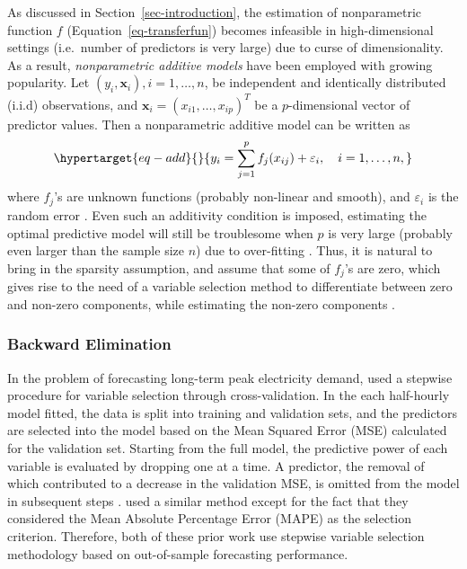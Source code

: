 \documentclass[11pt,a4paper,]{article}
\begin{document}
As discussed in Section~\ref{sec-introduction}, the estimation of
nonparametric function \(f\) (Equation~\ref{eq-transferfun}) becomes
infeasible in high-dimensional settings (i.e.~number of predictors is
very large) due to curse of dimensionality. As a result,
\emph{nonparametric additive models} have been employed with growing
popularity. Let \((y_{i}, \bm{x}_{i}), i = 1, \dots, n\), be independent
and identically distributed (i.i.d) observations, and
\(\bm{x}_{i} = (x_{i1}, \dots, x_{ip})^{T}\) be a \(p\)-dimensional
vector of predictor values. Then a nonparametric additive model can be
written as \begin{equation}\protect\hypertarget{eq-add}{}{
 y_{i} = \sum_{j=1}^{p} {f_{j}(x_{ij})} + \varepsilon_{i}, \quad i = 1, \dots, n,
}\label{eq-add}\end{equation} where \(f_{j}\)'s are unknown functions
(probably non-linear and smooth), and \(\varepsilon_{i}\) is the random
error \autocite{Lian2012}. Even such an additivity condition is imposed,
estimating the optimal predictive model will still be troublesome when
\(p\) is very large (probably even larger than the sample size \(n\))
due to over-fitting \autocite{Lian2012}. Thus, it is natural to bring in
the sparsity assumption, and assume that some of \(f_{j}\)'s are zero,
which gives rise to the need of a variable selection method to
differentiate between zero and non-zero components, while estimating the
non-zero components \autocite{Huang2010}.

\hypertarget{sec-backward}{%
\subsubsection{Backward Elimination}\label{sec-backward}}

In the problem of forecasting long-term peak electricity demand,
\textcite{HF2010} used a stepwise procedure for variable selection
through cross-validation. In the each half-hourly model fitted, the data
is split into training and validation sets, and the predictors are
selected into the model based on the Mean Squared Error (MSE) calculated
for the validation set. Starting from the full model, the predictive
power of each variable is evaluated by dropping one at a time. A
predictor, the removal of which contributed to a decrease in the
validation MSE, is omitted from the model in subsequent steps
\autocite{HF2010}. \textcite{FH2012} used a similar method except for
the fact that they considered the Mean Absolute Percentage Error (MAPE)
as the selection criterion. Therefore, both of these prior work use
stepwise variable selection methodology based on out-of-sample
forecasting performance.
\end{document}
